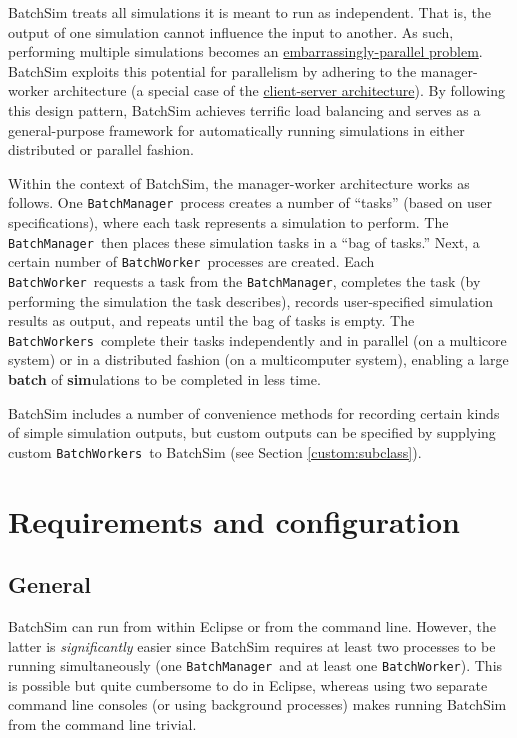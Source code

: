 \documentclass{article}
\newcommand{\BM}{{\tt BatchManager}}
\newcommand{\BW}{{\tt BatchWorker}}
\newcommand{\BWs}{{\tt BatchWorkers}}
\begin{document}
BatchSim treats all simulations it is meant to run as independent. That is, the output of one simulation cannot influence the input to another. As such, performing multiple simulations becomes an \href{https://en.wikipedia.org/wiki/Embarrassingly_parallel}{embarrassingly-parallel problem}. BatchSim exploits this potential for parallelism by adhering to the manager-worker architecture (a special case of the \href{https://en.wikipedia.org/wiki/Client?server_model}{client-server architecture}). By following this design pattern, BatchSim achieves terrific load balancing and serves as a general-purpose framework for automatically running simulations in either distributed or parallel fashion.

Within the context of BatchSim, the manager-worker architecture works as follows. One \BM\ process creates a number of ``tasks'' (based on user specifications), where each task represents a simulation to perform. The \BM\ then places these simulation tasks in a ``bag of tasks.'' Next, a certain number of \BW\ processes are created. Each \BW\ requests a task from the \BM, completes the task (by performing the simulation the task describes), records user-specified simulation results as output, and repeats until the bag of tasks is empty. The \BWs\ complete their tasks independently and in parallel (on a multicore system) or in a distributed fashion (on a multicomputer system), enabling a large \textbf{batch} of \textbf{sim}ulations to be completed in less time.
 
BatchSim includes a number of convenience methods for recording certain kinds of simple simulation outputs, but custom outputs can be specified by supplying custom \BWs\ to BatchSim (see Section \ref{custom:subclass}).

\section{Requirements and configuration}

\subsection{General}
\label{req:general}

BatchSim can run from within Eclipse or from the command line. However, the latter is \textit{significantly} easier since BatchSim requires at least two processes to be running simultaneously (one \BM\ and at least one \BW). This is possible but quite cumbersome to do in Eclipse, whereas using two separate command line consoles (or using background processes) makes running BatchSim from the command line trivial.
\end{document}
